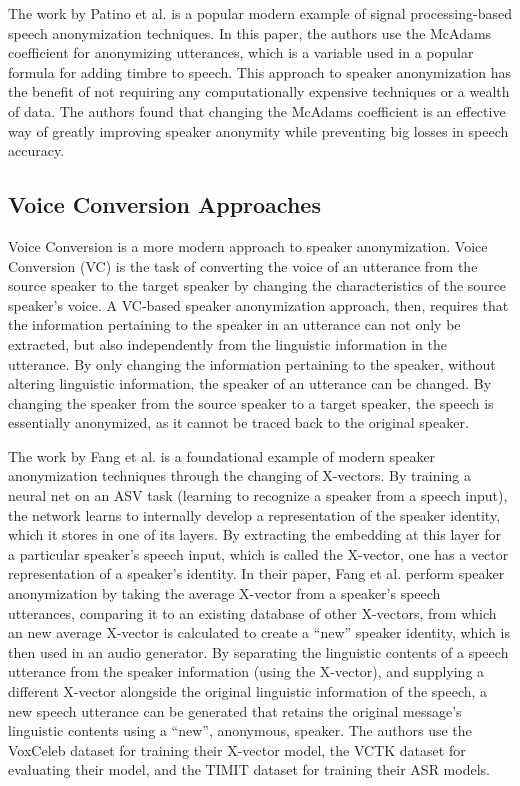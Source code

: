 \documentclass{Interspeech2024}
\begin{document}
The work by Patino et al. \cite{patino_2021_mcadams} is a popular modern example of signal processing-based speech anonymization techniques.
In this paper, the authors use the McAdams coefficient for anonymizing utterances, which is a variable used in a popular formula for adding timbre to speech. 
This approach to speaker anonymization has the benefit of not requiring any computationally expensive techniques or a wealth of data. 
The authors found that changing the McAdams coefficient is an effective way of greatly improving speaker anonymity while preventing big losses in speech accuracy.

\subsection{Voice Conversion Approaches}
Voice Conversion is a more modern approach to speaker anonymization.
Voice Conversion (VC) is the task of converting the voice of an utterance from the source speaker to the target speaker by changing the characteristics of the source speaker's voice.
A VC-based speaker anonymization approach, then, requires that the information pertaining to the speaker in an utterance can not only be extracted, but also independently from the linguistic information in the utterance.
By only changing the information pertaining to the speaker, without altering linguistic information, the speaker of an utterance can be changed.
By changing the speaker from the source speaker to a target speaker, the speech is essentially anonymized, as it cannot be traced back to the original speaker.

The work by Fang et al. \cite{fang_2019_xvector} is a foundational example of modern speaker anonymization techniques through the changing of X-vectors. 
By training a neural net on an ASV task (learning to recognize a speaker from a speech input), the network learns to internally develop a representation of the speaker identity, which it stores in one of its layers. 
By extracting the embedding at this layer for a particular speaker's speech input, which is called the X-vector, one has a vector representation of a speaker's identity.
In their paper, Fang et al. perform speaker anonymization by taking the average X-vector from a speaker's speech utterances, comparing it to an existing database of other X-vectors, from which an new average X-vector is calculated to create a “new” speaker identity, which is then used in an audio generator.
By separating the linguistic contents of a speech utterance from the speaker information (using the X-vector), and supplying a different X-vector alongside the original linguistic information of the speech, a new speech utterance can be generated that retains the original message's linguistic contents using a “new”, anonymous, speaker.
The authors use the VoxCeleb dataset for training their X-vector model, the VCTK dataset for evaluating their model, and the TIMIT dataset for training their ASR models.
\end{document}
